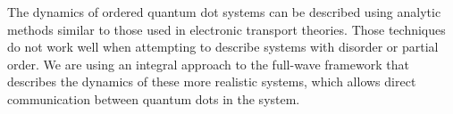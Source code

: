 The dynamics of ordered quantum dot systems can be described using analytic methods similar to those used in electronic transport theories.
Those techniques do not work well when attempting to describe systems with disorder or partial order.
We are using an integral approach to the full-wave framework that describes the dynamics of these more realistic systems, which allows direct communication between quantum dots in the system.
